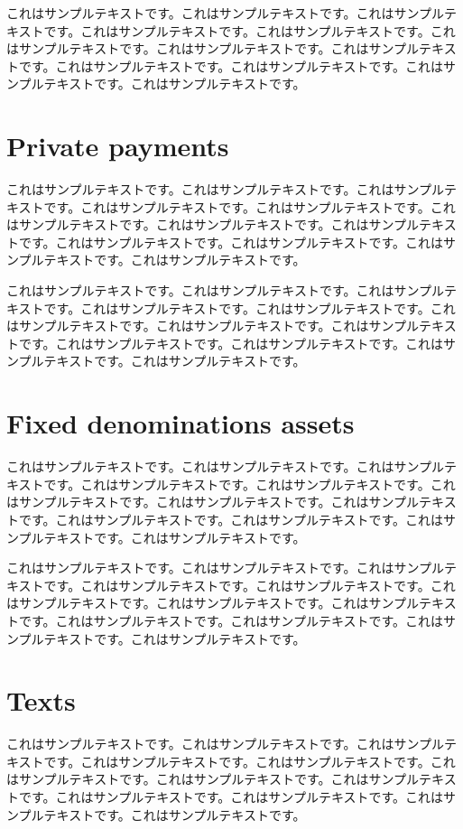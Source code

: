 \documentclass[a4paper, dvipdfmx]{jsarticle}
\begin{document}
これはサンプルテキストです。これはサンプルテキストです。これはサンプルテキストです。これはサンプルテキストです。これはサンプルテキストです。これはサンプルテキストです。これはサンプルテキストです。これはサンプルテキストです。これはサンプルテキストです。これはサンプルテキストです。これはサンプルテキストです。これはサンプルテキストです。

\section{Private payments}
これはサンプルテキストです。これはサンプルテキストです。これはサンプルテキストです。これはサンプルテキストです。これはサンプルテキストです。これはサンプルテキストです。これはサンプルテキストです。これはサンプルテキストです。これはサンプルテキストです。これはサンプルテキストです。これはサンプルテキストです。これはサンプルテキストです。

これはサンプルテキストです。これはサンプルテキストです。これはサンプルテキストです。これはサンプルテキストです。これはサンプルテキストです。これはサンプルテキストです。これはサンプルテキストです。これはサンプルテキストです。これはサンプルテキストです。これはサンプルテキストです。これはサンプルテキストです。これはサンプルテキストです。

\section{Fixed denominations assets}
これはサンプルテキストです。これはサンプルテキストです。これはサンプルテキストです。これはサンプルテキストです。これはサンプルテキストです。これはサンプルテキストです。これはサンプルテキストです。これはサンプルテキストです。これはサンプルテキストです。これはサンプルテキストです。これはサンプルテキストです。これはサンプルテキストです。

これはサンプルテキストです。これはサンプルテキストです。これはサンプルテキストです。これはサンプルテキストです。これはサンプルテキストです。これはサンプルテキストです。これはサンプルテキストです。これはサンプルテキストです。これはサンプルテキストです。これはサンプルテキストです。これはサンプルテキストです。これはサンプルテキストです。

\section{Texts}
これはサンプルテキストです。これはサンプルテキストです。これはサンプルテキストです。これはサンプルテキストです。これはサンプルテキストです。これはサンプルテキストです。これはサンプルテキストです。これはサンプルテキストです。これはサンプルテキストです。これはサンプルテキストです。これはサンプルテキストです。これはサンプルテキストです。
\end{document}
